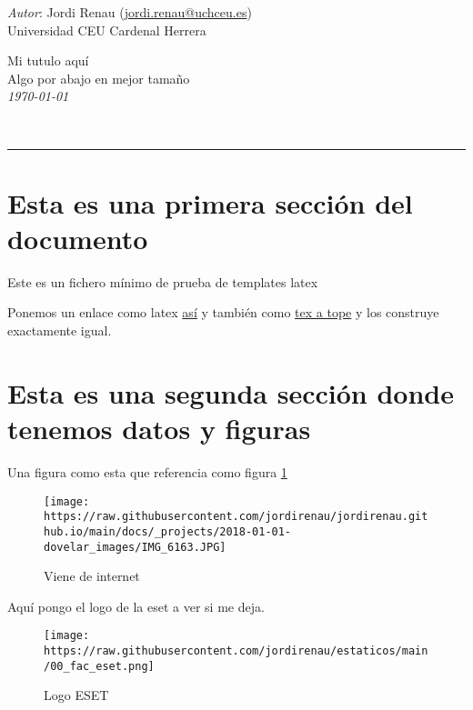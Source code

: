 \documentclass[11pt,a4paper,twoside,onecolumn,notitlepage,final]{scrartcl}
\date{\today}
\newcommand{\mititulo}{ Mi tutulo aquí }
\newcommand{\misubtitulo}{ Algo por abajo en mejor tamaño }
\begin{document}
	\renewcommand{\tablename}{Tabla}
	
			\begin{flushright}
			\thispagestyle{empty}
	\large
	\textit{Autor}: Jordi Renau (\href{mailto:jordi.renau@uchceu.es}{jordi.renau@uchceu.es}) \\
	Universidad CEU Cardenal Herrera %

	\Huge 
	\mititulo \\[0.5cm]
	\huge
	\misubtitulo \\[0.5cm]
	\small \textit{ \today }
\end{flushright}
		~

\hrule




\hypertarget{esta-es-una-primera-secciuxf3n-del-documento}{%
\section{Esta es una primera sección del
documento}\label{esta-es-una-primera-secciuxf3n-del-documento}}

Este es un fichero mínimo de prueba de templates latex

Ponemos un enlace como latex \href{www.uchceu.es}{así} y también como
\href{www.uchceu.es}{tex a tope} y los construye exactamente igual.

\hypertarget{esta-es-una-segunda-secciuxf3n-donde-tenemos-datos-y-figuras}{%
\section{Esta es una segunda sección donde tenemos datos y
figuras}\label{esta-es-una-segunda-secciuxf3n-donde-tenemos-datos-y-figuras}}

Una figura como esta que referencia como figura \ref{fig:internet}

\begin{figure}
\hypertarget{fig:internet}{%
\centering
\texttt{[image: https://raw.githubusercontent.com/jordirenau/jordirenau.github.io/main/docs/\_projects/2018-01-01-dovelar\_images/IMG\_6163.JPG]}
\caption{Viene de internet}\label{fig:internet}
}
\end{figure}

Aquí pongo el logo de la eset a ver si me deja.

\begin{figure}
\hypertarget{fig:logo}{%
\centering
\texttt{[image: https://raw.githubusercontent.com/jordirenau/estaticos/main/00\_fac\_eset.png]}
\caption{Logo ESET}\label{fig:logo}
}
\end{figure}
\end{document}
